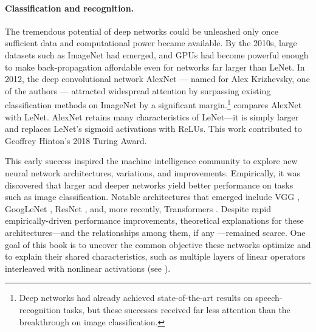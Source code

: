 \documentclass[../../book-main.tex]{subfiles}
\begin{document}
\paragraph{Classification and recognition.}
The tremendous potential of deep networks could be unleashed only once sufficient data and computational power became available. By the 2010s, large datasets such as ImageNet had emerged, and GPUs had become powerful enough to make back-propagation affordable even for networks far larger than LeNet. In 2012, the deep convolutional network AlexNet --- named for Alex Krizhevsky, one of the authors \cite{krizhevsky2012imagenet} --- attracted widespread attention by surpassing existing classification methods on ImageNet by a significant margin.\footnote{Deep networks had already achieved state-of-the-art results on speech-recognition tasks, but these successes received far less attention than the breakthrough on image classification.}  compares AlexNet with LeNet. AlexNet retains many characteristics of LeNet---it is simply larger and replaces LeNet's sigmoid activations with ReLUs. This work contributed to Geoffrey Hinton's 2018 Turing Award.

This early success inspired the machine intelligence community to explore new neural network architectures, variations, and improvements. Empirically, it was discovered that larger and deeper networks yield better performance on tasks such as image classification. Notable architectures that emerged include VGG \cite{Simonyan15}, GoogLeNet \cite{Szegedy2014GoingDW}, ResNet \cite{He2016-lc}, and, more recently, Transformers \cite{vaswani2017attention}. Despite rapid empirically-driven performance improvements, theoretical explanations for these architectures---and the relationships among them, if any ---remained scarce. One goal of this book is to uncover the common objective these networks optimize and to explain their shared characteristics, such as multiple layers of linear operators interleaved with nonlinear activations (see ).
\end{document}
